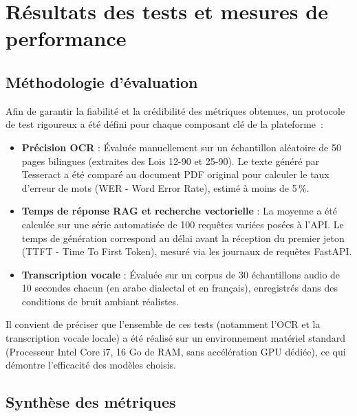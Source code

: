 \documentclass[12pt,a4paper]{report}
\begin{document}
\section{Résultats des tests et mesures de performance}

\subsection{Méthodologie d'évaluation}

Afin de garantir la fiabilité et la crédibilité des métriques obtenues, un protocole de test rigoureux a été défini pour chaque composant clé de la plateforme~:

\begin{itemize}[label=\textbullet]
    \item \textbf{Précision OCR} : Évaluée manuellement sur un échantillon aléatoire de 50 pages bilingues (extraites des Lois 12-90 et 25-90). Le texte généré par Tesseract a été comparé au document PDF original pour calculer le taux d'erreur de mots (WER - Word Error Rate), estimé à moins de 5\,\%.
    \item \textbf{Temps de réponse RAG et recherche vectorielle} : La moyenne a été calculée sur une série automatisée de 100 requêtes variées posées à l'API. Le temps de génération correspond au délai avant la réception du premier jeton (TTFT - Time To First Token), mesuré via les journaux de requêtes FastAPI.
    \item \textbf{Transcription vocale} : Évaluée sur un corpus de 30 échantillons audio de 10 secondes chacun (en arabe dialectal et en français), enregistrés dans des conditions de bruit ambiant réalistes.
\end{itemize}

Il convient de préciser que l'ensemble de ces tests (notamment l'OCR et la transcription vocale locale) a été réalisé sur un environnement matériel standard (Processeur Intel Core i7, 16 Go de RAM, sans accélération GPU dédiée), ce qui démontre l'efficacité des modèles choisis.

\subsection{Synthèse des métriques}
\end{document}
